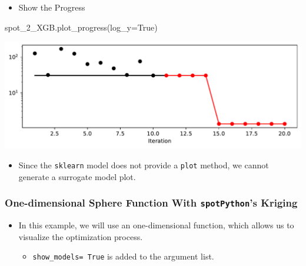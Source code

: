 \documentclass[
  letterpaper,
  DIV=11,
  numbers=noendperiod]{scrreprt}
\newenvironment{Shaded}{\begin{snugshade}}{\end{snugshade}}
\newcommand{\NormalTok}[1]{\textcolor[rgb]{0.00,0.23,0.31}{#1}}
\newcommand{\OperatorTok}[1]{\textcolor[rgb]{0.37,0.37,0.37}{#1}}
\newcommand{\VariableTok}[1]{\textcolor[rgb]{0.07,0.07,0.07}{#1}}
\providecommand{\tightlist}{%
  \setlength{\itemsep}{0pt}\setlength{\parskip}{0pt}}\usepackage{longtable,booktabs,array}
\begin{document}
\begin{itemize}
\tightlist
\item
  Show the Progress
\end{itemize}

\begin{Shaded}
\begin{Highlighting}[]
\NormalTok{spot\_2\_XGB.plot\_progress(log\_y}\OperatorTok{=}\VariableTok{True}\NormalTok{)}
\end{Highlighting}
\end{Shaded}

\includegraphics{010_num_spot_sklearn_surrogate_files/figure-pdf/cell-37-output-1.pdf}

\begin{itemize}
\tightlist
\item
  Since the \texttt{sklearn} model does not provide a \texttt{plot}
  method, we cannot generate a surrogate model plot.
\end{itemize}

\subsubsection{\texorpdfstring{One-dimensional Sphere Function With
\texttt{spotPython}'s
Kriging}{One-dimensional Sphere Function With spotPython's Kriging}}\label{one-dimensional-sphere-function-with-spotpythons-kriging}

\begin{itemize}
\tightlist
\item
  In this example, we will use an one-dimensional function, which allows
  us to visualize the optimization process.

  \begin{itemize}
  \tightlist
  \item
    \texttt{show\_models=\ True} is added to the argument list.
  \end{itemize}
\end{itemize}
\end{document}

